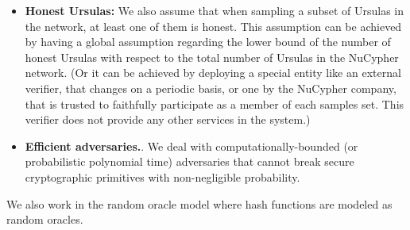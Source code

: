 \begin{itemize}
\item {\bf Honest Ursulas:} We also assume that when sampling a subset of Ursulas in the network, at least one of them is honest. This assumption can be achieved by having a global assumption regarding the lower bound of the number of honest Ursulas with respect to the total number of Ursulas in the NuCypher network. (Or it can be achieved by deploying a special entity like an external verifier, that changes on a periodic basis, or one by the NuCypher company, that is trusted to faithfully participate as a member of each samples set. This verifier does not provide any other services in the system.)


\item {\bf Efficient adversaries.}. We deal with computationally-bounded (or probabilistic polynomial time) adversaries that cannot break secure cryptographic primitives with non-negligible probability.
\end{itemize}


We also work in the random oracle model where hash functions are modeled as random oracles.



